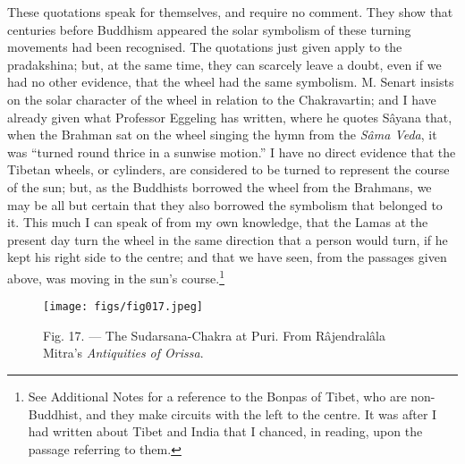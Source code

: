 \documentclass[a4paper, 11pt, oneside, polutonikogreek, english]{article}
\begin{document}
These quotations speak for themselves, and require no comment. They show that centuries before Buddhism appeared the solar symbolism of these turning movements had been recognised. The quotations just given apply to the pradakshina; but, at the same time, they can scarcely leave a doubt, even if we had no other evidence, that the wheel had the same symbolism. M. Senart insists on the solar character of the wheel in relation to the Chakravartin; and I have already given what Professor Eggeling has written, where he quotes Sâyana that, when the Brahman sat on the wheel singing the hymn from the \emph{Sâma Veda}, it was ``turned round thrice in a sunwise motion.'' I have no direct evidence that the Tibetan wheels, or cylinders, are considered to be turned to represent the course of the sun; but, as the Buddhists borrowed the wheel from the Brahmans, we may be all but certain that they also borrowed the symbolism that belonged to it. This much I can speak of from my own knowledge, that the Lamas at the present day turn the wheel in the same direction that a person would turn, if he kept his right side to the centre; and that we have seen, from the passages given above, was moving in the sun's course.\footnote{See Additional Notes for a reference to the Bonpas of Tibet, who are non-Buddhist, and they make circuits with the left to the centre. It was after I had written about Tibet and India that I chanced, in reading, upon the passage referring to them.}

\begin{figure}[H]
\centering
\texttt{[image: figs/fig017.jpeg]}
\caption[Fig. 17. --- The Sudarsana-Chakra at Puri.]{Fig. 17. --- The Sudarsana-Chakra at Puri. From Râjendralâla Mitra's \emph{Antiquities of Orissa}.}
\end{figure}
\end{document}
